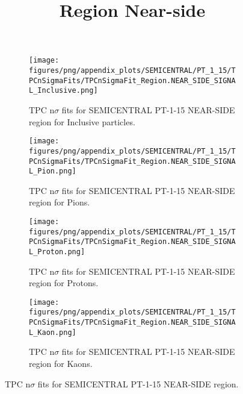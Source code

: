             \begin{figure}[H]
                \title{Region Near-side}
                \begin{subfigure}[b]{0.5\textwidth}
                    \centering
                    \texttt{[image: figures/png/appendix\_plots/SEMICENTRAL/PT\_1\_15/TPCnSigmaFits/TPCnSigmaFit\_Region.NEAR\_SIDE\_SIGNAL\_Inclusive.png]}
                    \caption{TPC n$\sigma$ fits for SEMICENTRAL PT-1-15 NEAR-SIDE region for Inclusive particles.}
                    \label{fig:appendix_SEMICENTRAL_PT-1-15_NEAR_SIDE_SIGNAL_Inclusive}
                \end{subfigure}
                \begin{subfigure}[b]{0.5\textwidth}
                    \centering
                    \texttt{[image: figures/png/appendix\_plots/SEMICENTRAL/PT\_1\_15/TPCnSigmaFits/TPCnSigmaFit\_Region.NEAR\_SIDE\_SIGNAL\_Pion.png]}
                    \caption{TPC n$\sigma$ fits for SEMICENTRAL PT-1-15 NEAR-SIDE region for Pions.}
                    \label{fig:appendix_SEMICENTRAL_PT-1-15_NEAR_SIDE_SIGNAL_Pion}
                \end{subfigure}
                \begin{subfigure}[b]{0.5\textwidth}
                    \centering
                    \texttt{[image: figures/png/appendix\_plots/SEMICENTRAL/PT\_1\_15/TPCnSigmaFits/TPCnSigmaFit\_Region.NEAR\_SIDE\_SIGNAL\_Proton.png]}
                    \caption{TPC n$\sigma$ fits for SEMICENTRAL PT-1-15 NEAR-SIDE region for Protons.}
                    \label{fig:appendix_SEMICENTRAL_PT-1-15_NEAR_SIDE_SIGNAL_Proton}
                \end{subfigure}
                \begin{subfigure}[b]{0.5\textwidth}
                    \centering
                    \texttt{[image: figures/png/appendix\_plots/SEMICENTRAL/PT\_1\_15/TPCnSigmaFits/TPCnSigmaFit\_Region.NEAR\_SIDE\_SIGNAL\_Kaon.png]}
                    \caption{TPC n$\sigma$ fits for SEMICENTRAL PT-1-15 NEAR-SIDE region for Kaons.}
                    \label{fig:appendix_SEMICENTRAL_PT-1-15_NEAR_SIDE_SIGNAL_Kaon}
                \end{subfigure}
                \caption{TPC n$\sigma$ fits for SEMICENTRAL PT-1-15 NEAR-SIDE region.}
                \label{fig:appendix_SEMICENTRAL_PT-1-15_NEAR_SIDE_SIGNAL}
            \end{figure}

